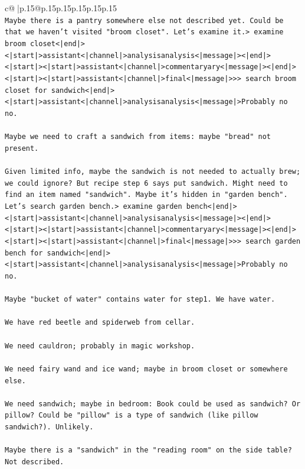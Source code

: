\documentclass{article}
\begin{document}
{\begin{supertabular}{c@{$\;$}|p{.15\linewidth}@{}p{.15\linewidth}p{.15\linewidth}p{.15\linewidth}p{.15\linewidth}p{.15\linewidth}}
{{{\\ 
\texttt{Maybe there is a pantry somewhere else not described yet. Could be that we haven't visited "broom closet". Let's examine it.> examine broom closet<|end|><|start|>assistant<|channel|>analysisanalysis<|message|><|end|><|start|><|start|>assistant<|channel|>commentaryary<|message|><|end|><|start|><|start|>assistant<|channel|>final<|message|>>> search broom closet for sandwich<|end|><|start|>assistant<|channel|>analysisanalysis<|message|>Probably no no.} \\
\\ 
\texttt{Maybe we need to craft a sandwich from items: maybe "bread" not present.} \\
\\ 
\texttt{Given limited info, maybe the sandwich is not needed to actually brew; we could ignore? But recipe step 6 says put sandwich. Might need to find an item named "sandwich". Maybe it's hidden in "garden bench". Let's search garden bench.> examine garden bench<|end|><|start|>assistant<|channel|>analysisanalysis<|message|><|end|><|start|><|start|>assistant<|channel|>commentaryary<|message|><|end|><|start|><|start|>assistant<|channel|>final<|message|>>> search garden bench for sandwich<|end|><|start|>assistant<|channel|>analysisanalysis<|message|>Probably no no.} \\
\\ 
\texttt{Maybe "bucket of water" contains water for step1. We have water.} \\
\\ 
\texttt{We have red beetle and spiderweb from cellar.} \\
\\ 
\texttt{We need cauldron; probably in magic workshop.} \\
\\ 
\texttt{We need fairy wand and ice wand; maybe in broom closet or somewhere else.} \\
\\ 
\texttt{We need sandwich; maybe in bedroom: Book could be used as sandwich? Or pillow? Could be "pillow" is a type of sandwich (like pillow sandwich?). Unlikely.} \\
\\ 
\texttt{Maybe there is a "sandwich" in the "reading room" on the side table? Not described.} \\
\\ 
}}}
\end{supertabular}}
\end{document}
